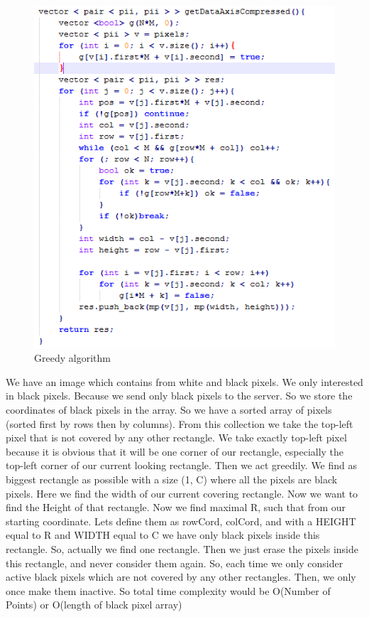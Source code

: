 \begin{figure}[h]
    \centering
    \includegraphics[]{Figures/greedy_algorithm}
    \caption{Greedy algorithm}
    \label{fig:greedy_algorithm}
\end{figure}


We have an image which contains from white and black pixels. We only interested in black pixels. Because we send only black pixels to the server. So we store the coordinates of black pixels in the array. So we have a sorted array of pixels (sorted first by rows then by columns). From this collection we take the top-left pixel that is not covered by any other rectangle. We take exactly top-left pixel because it is obvious that it will be one corner of our rectangle, especially the top-left corner of our current looking rectangle. Then we act greedily. We find as biggest rectangle as possible with a size (1, C) where all the pixels are black pixels. Here we find the width of our current covering rectangle. Now we want to find the Height of that rectangle. Now we find maximal R, such that from our starting coordinate. Lets define them as rowCord, colCord, and with a HEIGHT equal to R and WIDTH equal to C we have only black pixels inside this rectangle. So, actually we find one rectangle. Then we just erase the pixels inside this rectangle, and never consider them again. So, each time we only consider active black pixels which are not covered by any other rectangles. Then, we only once make them inactive. So total time complexity would be O(Number of Points) or O(length of black pixel array)




